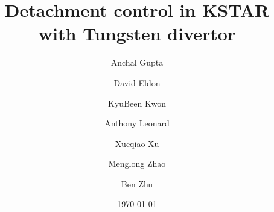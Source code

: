 \documentclass[final,5p,times]{elsarticle}  %
\begin{document}
\title{Detachment control in KSTAR with Tungsten divertor}
\author[ORAU]{Anchal Gupta}

\author[GA]{David Eldon}

\author[ORAU]{KyuBeen Kwon}

\author[GA]{Anthony Leonard}

\author[LLNL]{Xueqiao Xu}

\author[LLNL]{Menglong Zhao}

\author[LLNL]{Ben Zhu}

\address[ORAU]{\ORAU}
\address[GA]{\GA}
\address[LLNL]{\LLNL}

\date{\today}



\acresetall  %

\maketitle












\end{document}

